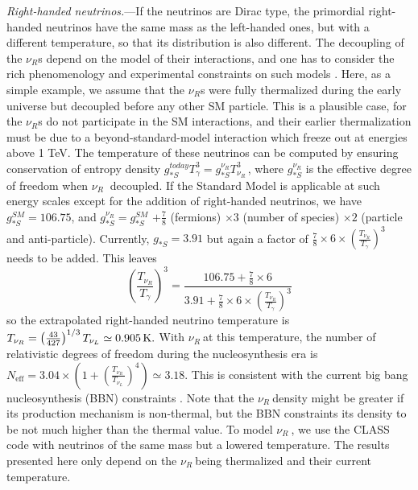 \documentclass[aps,prl,twocolumn,showpacs,superscriptaddress,groupedaddress,nofootinbib]{revtex4}  %
\newcommand{\mr}{\mathrm}
\newcommand{\K}{\ensuremath{\, {\rm K}}}
\newcommand{\nur}{\ensuremath{{\nu_R~}}}
\newcommand{\nul}{\ensuremath{{\nu_L~}}}
\begin{document}
{\it Right-handed neutrinos.}---If the neutrinos are Dirac type, the 
primordial right-handed neutrinos have the same mass as the left-handed ones, 
but with a different temperature, so that its distribution is also different. The decoupling of 
the $\nu_R$s depend on the model of their interactions, and 
one has to consider the rich phenomenology and experimental constraints on 
such models \cite{2009RvMP...81.1199L,2014ChPhC..38i0001O}. Here, as a simple
example, we assume that the $\nu_R$s were 
fully thermalized during the early universe but decoupled before any
other SM particle. This is a plausible case, for the $\nu_R$s do not participate in 
the SM interactions, and their earlier thermalization must be due to a beyond-standard-model
interaction which freeze out at energies above 1 TeV.
The temperature of these neutrinos can be computed
by ensuring conservation of entropy density $g_{*S}^{today}T_\gamma^3
= g_{*S}^{\nu_R}T_\nur^3$, where $g_{*S}^{\nu_R}$ is the effective degree of freedom
when $\nur$ decoupled. If the Standard Model is applicable at such energy
scales except for the addition of right-handed neutrinos, we have 
 $g_{*S}^{SM} = 106.75$, and $g_{*S}^{\nu_R}=g_{*S}^{SM}$
$+\frac{7}{8}$ (fermions) $ \times 3$ (number of
species) $\times 2$ (particle and anti-particle).  Currently, $g_{*S}
= 3.91$ but again a factor of
$\frac{7}{8}\times6\times(\frac{T_{\nu_R}}{T_\gamma})^3 $
needs to be added.  This leaves
\begin{equation}
\left(\frac{T_{\nu_R}}{T_\gamma}\right)^3 = \frac{106.75 + \frac{7}{8}\times6}{3.91 +
\frac{7}{8}\times6\times\left(\frac{T_{\nu_R}}{T_\gamma}\right)^3}
\end{equation}
so the extrapolated right-handed neutrino temperature is 
$T_{\nu_R} 
=\left(\frac{43}{427}\right)^{1/3}T_{\nu_L} \simeq 0.905 \K .$
With \nur at this temperature, the number of relativistic degrees of
freedom during the nucleosynthesis era 
is $N_\mr{eff} = 3.04 \times (1 + (\frac{T_\nur}{T_\nul})^4)
\simeq 3.18$.  This is consistent with the current 
big bang nucleosynthesis (BBN) constraints \cite{2013PhLB..718.1162A}.
Note that the \nur density might be greater if its production 
mechanism is non-thermal, but the BBN constraints its 
density to be not much higher than the thermal value.
To model \nur, we use the CLASS code  \cite{ClassCode}
with neutrinos of the
same mass but a lowered temperature.  The results presented here
only depend on the \nur being thermalized and their current
temperature.  
\end{document}
